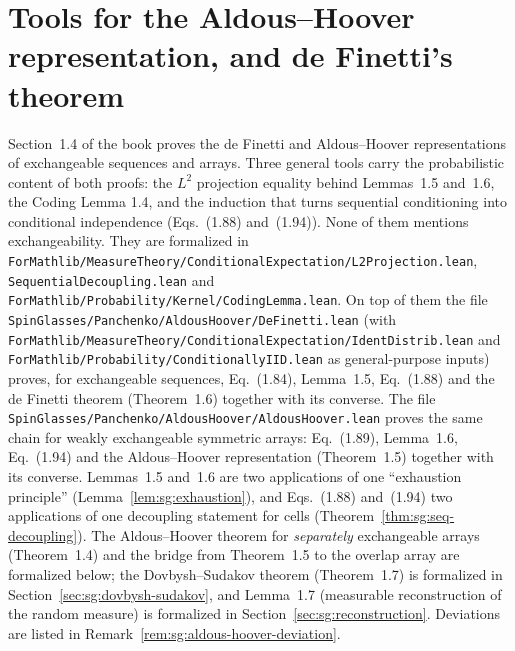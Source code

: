 \section{Tools for the Aldous--Hoover representation, and de Finetti's theorem}\label{sec:sg:aldous-hoover}

Section~1.4 of the book proves the de Finetti and Aldous--Hoover representations of exchangeable sequences and arrays. Three general tools carry the probabilistic content of both proofs:
the $L^2$ projection equality behind Lemmas~1.5 and~1.6, the Coding Lemma 1.4, and the induction that turns sequential
conditioning into conditional independence (Eqs.~(1.88) and~(1.94)). None of them mentions exchangeability. They are formalized in
\texttt{ForMathlib/MeasureTheory/ConditionalExpectation/L2Projection.lean}, \texttt{SequentialDecoupling.lean} and \texttt{ForMathlib/Probability/Kernel/CodingLemma.lean}.
On top of them the file \texttt{SpinGlasses/Panchenko/AldousHoover/DeFinetti.lean} (with \texttt{ForMathlib/MeasureTheory/ConditionalExpectation/IdentDistrib.lean} and \texttt{ForMathlib/Probability/ConditionallyIID.lean} as general-purpose inputs)
proves, for exchangeable sequences, Eq.~(1.84), Lemma~1.5, Eq.~(1.88) and the de Finetti theorem (Theorem~1.6) together with its converse.
The file \texttt{SpinGlasses/Panchenko/AldousHoover/AldousHoover.lean} proves the same chain for weakly exchangeable symmetric arrays: Eq.~(1.89), Lemma~1.6, Eq.~(1.94) and the Aldous--Hoover representation (Theorem~1.5) together with its converse.
Lemmas~1.5 and~1.6 are two applications of one ``exhaustion principle'' (Lemma~\ref{lem:sg:exhaustion}), and Eqs.~(1.88) and~(1.94) two applications of one decoupling statement for cells (Theorem~\ref{thm:sg:seq-decoupling}).
The Aldous--Hoover theorem for \emph{separately} exchangeable arrays (Theorem~1.4) and the bridge from Theorem~1.5 to the overlap array are formalized below; the Dovbysh--Sudakov theorem (Theorem~1.7) is formalized in Section~\ref{sec:sg:dovbysh-sudakov}, and Lemma~1.7 (measurable reconstruction of the random measure) is formalized in Section~\ref{sec:sg:reconstruction}.
Deviations are listed in Remark~\ref{rem:sg:aldous-hoover-deviation}.

